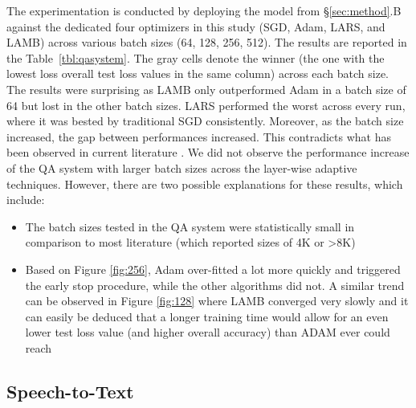 The experimentation is conducted by deploying the model from \S\ref{sec:method}.B against the dedicated four optimizers in this study (SGD, Adam, LARS, and LAMB) across various batch sizes (64, 128, 256, 512). The results are reported in the Table~\ref{tbl:qasystem}. The gray cells denote the winner (the one with the lowest loss overall test loss values in the same column) across each batch size. The results were surprising as LAMB only outperformed Adam in a batch size of 64 but lost in the other batch sizes. LARS performed the worst across every run, where it was bested by traditional SGD consistently. Moreover, as the batch size increased, the gap between performances increased. This contradicts what has been observed in current literature \cite{}. We did not observe the performance increase of the QA system with larger batch sizes across the layer-wise adaptive techniques. However, there are two possible explanations for these results, which include: 
\begin{itemize}
    \item The batch sizes tested in the QA system were statistically small in comparison to most literature (which reported sizes of 4K or >8K)
    \item Based on Figure \ref{fig:256}, Adam over-fitted a lot more quickly and triggered the early stop procedure, while the other algorithms did not. A similar trend can be observed in Figure \ref{fig:128} where LAMB converged very slowly and it can easily be deduced that a longer training time would allow for an even lower test loss value (and higher overall accuracy) than ADAM ever could reach
\end{itemize}

\subsection{Speech-to-Text}

